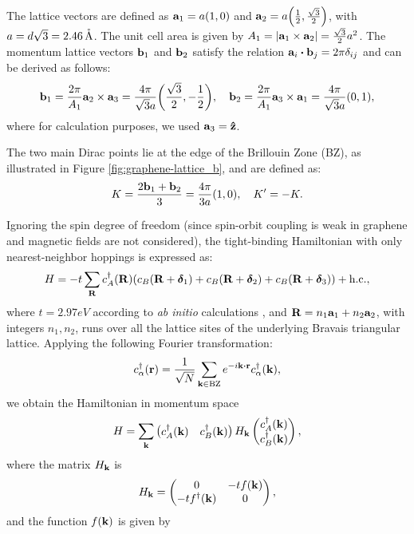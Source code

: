 The lattice vectors are defined as \(\vb{a}_1 = a \qty(1, 0)\) and \(\vb{a}_2 = a \qty(\frac{1}{2}, \frac{\sqrt{3}}{2})\), with $a = d\sqrt{3} = 2.46 \, \AA$. The unit cell area is given by \( A_1 = \abs{\a_1 \times \a_2} = \frac{\sqrt{3}}{2} a^2 \). The momentum lattice vectors \(\b_1\) and \(\b_2\) satisfy the relation \(\a_i \vdot \b_j = 2\pi \delta_{ij}\) and can be derived as follows:
\begin{equation} \label{eq:monolayer-bvecs}
\b_1 = \frac{2\pi}{A_1} \a_2 \times \a_3 = \frac{4\pi}{\sqrt{3} a } \qty(\frac{\sqrt{3}}{2}, -\frac{1}{2}), \quad
\b_2 = \frac{2\pi}{A_1} \a_3 \times \a_1 = \frac{4\pi}{\sqrt{3} a } \qty(0, 1),
\end{equation}
where for calculation purposes, we used \(\a_3 = \vu{z}\).

The two main Dirac points lie at the edge of the Brillouin Zone (BZ), as illustrated in Figure \ref{fig:graphene-lattice_b}, and are defined as:
\begin{equation} \label{eq:monolayer-dirac-points}
K = \frac{2\b_1 + \b_2}{3} = \frac{4\pi}{3a} (1, 0) , \quad K' = -K.
\end{equation}

Ignoring the spin degree of freedom (since spin-orbit coupling is weak in graphene and magnetic fields are not considered), the tight-binding Hamiltonian with only nearest-neighbor hoppings is expressed as:
\begin{equation} \label{eq:monolayer-tight-binding}
H = -t \sum_{\R} c^\d_A(\R) \qty(c_B(\R + \vdelta_1) + c_B(\R+\vdelta_2) + c_B(\R+\vdelta_3)) + \hc,
\end{equation}
where $t = 2.97 \unit{eV}$ according to \textit{ab initio} calculations \cite{handbook2019}, and \(\R = n_1 \a_1 + n_2 \a_2\), with integers \(n_1, n_2\), runs over all the lattice sites of the underlying Bravais triangular lattice. Applying the following Fourier transformation:
\begin{equation} \label{eq:monolayer-fourier}
c_{\alpha}^\d(\r) = \frac{1}{\sqrt{N}} \sum_{\k \in \text{BZ}} e^{-i \k \vdot \r} c_\alpha^\d(\k),
\end{equation}
we obtain the Hamiltonian in momentum space
\begin{equation} \label{eq:monolayer-tight-binding2}
H = \sum_{\k}
\begin{pmatrix}
c_A^\d(\k) & c_B^\d(\k)
\end{pmatrix}
H_\k
\begin{pmatrix}
c_A^\d(\k) \\ c_B^\d(\k)
\end{pmatrix},
\end{equation}
where the matrix \(H_\k\) is
\begin{equation} \label{eq:hamiltonian_k_monolayer}
H_\k =
\begin{pmatrix}
0 & -t f(\k) \\
-t f^{\dagger}(\k) & 0
\end{pmatrix},
\end{equation}
and the function \(f(\k)\) is given by

